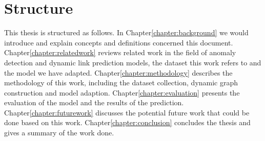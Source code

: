 \section{Structure}

This thesis is structured as follows. In Chapter\ref{chapter:background} we would introduce and explain concepts and definitions concerned this document. Chapter\ref{chapter:relatedwork} reviews related work in the field of anomaly detection and dynamic link prediction models, the dataset this work refers to and the model we have adapted. Chapter\ref{chapter:methodology} describes the methodology of this work, including the dataset collection, dynamic graph construction and model adaption. Chapter\ref{chapter:evaluation} presents the evaluation of the model and the results of the prediction. Chapter\ref{chapter:futurework} discusses the potential future work that could be done based on this work. Chapter\ref{chapter:conclusion} concludes the thesis and gives a summary of the work done.





